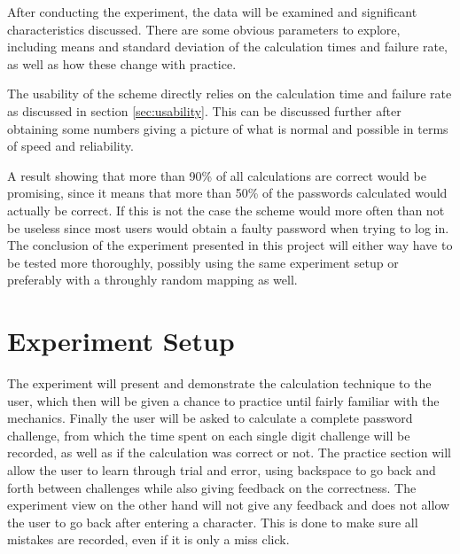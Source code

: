 \par After conducting the experiment, the data will be examined and significant characteristics discussed. There are some obvious parameters to explore, including means and standard deviation of the calculation times and failure rate, as well as how these change with practice. 

\par The usability of the scheme directly relies on the calculation time and failure rate as discussed in section \ref{sec:usability}. This can be discussed further after obtaining some numbers giving a picture of what is normal and possible in terms of speed and reliability.
\par A result showing that more than 90\% of all calculations are correct would be promising, since it means that more than 50\% of the passwords calculated would actually be correct. If this is not the case the scheme would more often than not be useless since most users would obtain a faulty password when trying to log in. The conclusion of the experiment presented in this project will either way have to be tested more thoroughly, possibly using the same experiment setup or preferably with a throughly random mapping as well. 



\section{Experiment Setup}
The experiment will present and demonstrate the calculation technique to the user, which then will be given a chance to practice until fairly familiar with the mechanics. Finally the user will be asked to calculate a complete password challenge, from which the time spent on each single digit challenge will be recorded, as well as if the calculation was correct or not. The practice section will allow the user to learn through trial and error, using backspace to go back and forth between challenges while also giving feedback on the correctness. The experiment view on the other hand will not give any feedback and does not allow the user to go back after entering a character. This is done to make sure all mistakes are recorded, even if it is only a miss click. 
